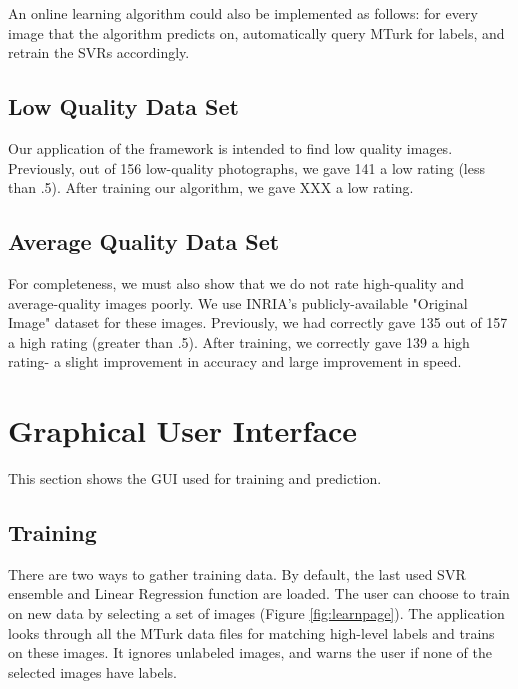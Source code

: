 \documentclass[11pt,letter]{article}
\begin{document}
An online learning algorithm could also be implemented as follows: for every image that the algorithm predicts on, automatically query MTurk for labels, and retrain the SVRs accordingly.

\subsection{Low Quality Data Set}
Our application of the framework is intended to find low quality images. Previously, out of 156 low-quality photographs, we gave 141 a low rating (less than .5). After training our algorithm, we gave XXX a low rating.

\subsection{Average Quality Data Set}
For completeness, we must also show that we do not rate high-quality and average-quality images poorly. We use INRIA's publicly-available "Original Image" dataset\cite{JDS08} for these images. Previously, we had correctly gave 135 out of 157 a high rating (greater than .5). After training, we correctly gave 139 a high rating- a slight improvement in accuracy and large improvement in speed.

\appendix
\section{Graphical User Interface}
This section shows the GUI used for training and prediction.

\subsection{Training}
There are two ways to gather training data. By default, the last used SVR ensemble and Linear Regression function are loaded. The user can choose to train on new data by selecting a set of images (Figure \ref{fig:learnpage}). The application looks through all the MTurk data files for matching high-level labels and trains on these images. It ignores unlabeled images, and warns the user if none of the selected images have labels.

\begin{figure*}[h!]
  \centering
  \caption{When learning, the user has two options. The first option is to choose a new set of images to train on. The second is to select saved training data.}
  \label{fig:learnpage}
\end{figure*}
\end{document}
